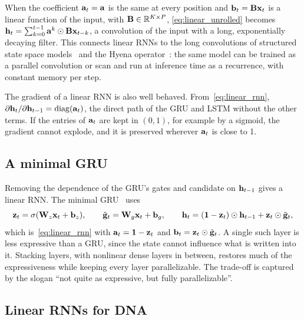 When the coefficient $\mathbf{a}_t=\mathbf{a}$ is the same at every position and $\mathbf{b}_t=\mathbf{B}\mathbf{x}_t$ is a linear function of the input, with $\mathbf{B}\in\mathbb{R}^{K\times P}$, \eqref{eq:linear_unrolled} becomes $\mathbf{h}_t=\sum_{k=0}^{t-1}\mathbf{a}^k\odot\mathbf{B}\mathbf{x}_{t-k}$, a convolution of the input with a long, exponentially decaying filter. This connects linear RNNs to the long convolutions of structured state space models~\citep{gu2022} and the Hyena operator~\citep{poli2023}: the same model can be trained as a parallel convolution or scan and run at inference time as a recurrence, with constant memory per step.

The gradient of a linear RNN is also well behaved. From~\eqref{eq:linear_rnn}, $\partial\mathbf{h}_t/\partial\mathbf{h}_{t-1}=\operatorname{diag}(\mathbf{a}_t)$, the direct path of the GRU and LSTM without the other terms. If the entries of $\mathbf{a}_t$ are kept in $(0,1)$, for example by a sigmoid, the gradient cannot explode, and it is preserved wherever $\mathbf{a}_t$ is close to 1.

\subsection{A minimal GRU}

Removing the dependence of the GRU's gates and candidate on $\mathbf{h}_{t-1}$ gives a linear RNN. The minimal GRU~\citep{feng2024} uses
\begin{equation}
  \mathbf{z}_t = \sigma(\mathbf{W}_z\mathbf{x}_t+\mathbf{b}_z), \qquad \tilde{\mathbf{g}}_t = \mathbf{W}_g\mathbf{x}_t+\mathbf{b}_g, \qquad
  \mathbf{h}_t = (\mathbf{1}-\mathbf{z}_t)\odot\mathbf{h}_{t-1} + \mathbf{z}_t\odot\tilde{\mathbf{g}}_t ,
\end{equation}
which is~\eqref{eq:linear_rnn} with $\mathbf{a}_t=\mathbf{1}-\mathbf{z}_t$ and $\mathbf{b}_t=\mathbf{z}_t\odot\tilde{\mathbf{g}}_t$. A single such layer is less expressive than a GRU, since the state cannot influence what is written into it. Stacking layers, with nonlinear dense layers in between, restores much of the expressiveness while keeping every layer parallelizable. The trade-off is captured by the slogan ``not quite as expressive, but fully parallelizable''.

\subsection{Linear RNNs for DNA}

